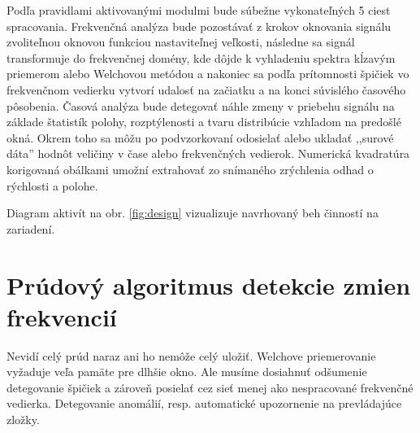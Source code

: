 Podľa pravidlami aktivovanými modulmi bude súbežne vykonateľných 5 ciest spracovania. 
Frekvenčná analýza bude pozostávať z krokov oknovania signálu  zvoliteľnou oknovou funkciou nastaviteľnej veľkosti,
následne sa signál transformuje do frekvenčnej domény,
kde dôjde k vyhladeniu spektra kĺzavým priemerom alebo Welchovou metódou a nakoniec sa podľa prítomnosti špičiek
vo frekvenčnom vedierku vytvorí udalosť na začiatku a na konci súvislého časového pôsobenia. Časová analýza
bude detegovať náhle zmeny v priebehu signálu na základe štatistík polohy, rozptýlenosti a tvaru
distribúcie vzhľadom na predošlé okná. Okrem toho sa môžu po podvzorkovaní odosielať alebo ukladať ,,surové dáta''
hodnôt veličiny v čase alebo frekvenčných vedierok. Numerická kvadratúra korigovaná obálkami umožní extrahovať zo
snímaného zrýchlenia odhad o rýchlosti a polohe.

Diagram aktivít na obr. \ref{fig:design}
vizualizuje navrhovaný beh činností na zariadení.

\clearpage


\section{Prúdový algoritmus detekcie zmien frekvencií}
Nevidí celý prúd naraz ani ho nemôže celý uložiť. Welchove priemerovanie vyžaduje veľa pamäte pre dlhšie okno.
Ale musíme dosiahnuť odšumenie detegovanie špičiek a zároveň posielať cez sieť menej ako nespracované
frekvenčné vedierka. Detegovanie anomálií, resp. automatické upozornenie na prevládajúce zložky.

